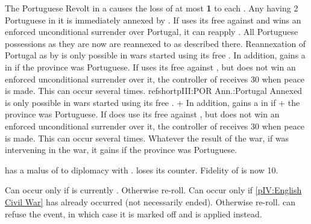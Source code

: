 \phpaix
\aparag The Portuguese Revolt in a \COL causes the loss of at most {\bf 1}
\STAB to each \MAJ.
\aparag Any \COL having 2 Portuguese \REVOLT \faceplus in it is immediately
annexed by \paysPortugal.
\aparag If \SPA uses its free \CB against \paysPortugal and wins an enforced
unconditional surrender over Portugal, it can reapply . All Portuguese possessions as they are now are
reannexed to \SPA as described there. Reannexation of Portugal as by
 is only possible in wars \SPA
started using its free \CB. In addition, \SPA gains a \Presidio in
\provinceTanger if the province was Portuguese.
\aparag If \SPA uses its free \CB against \paysPortugal, but does not win an
enforced unconditional surrender over it, the controller of \paysPortugal
receives 30 \VP when peace is made. This can occur several times.
refshort{pIII:POR Ann.:Portugal Annexed} is only possible in wars \SPA started
using its free \CB.  + \fphase In addition, \SPA gains a \Presidio in
 if + the province was Portuguese.  \ephase If \SPA does use
its free \CB against , but does not win an enforced
unconditional surrender over it, the controller of  receives 30
\VP when peace is made. This can occur several times.
\aparag Whatever the result of the war, if \ENG was intervening in the war, it
gains \provinceTanger if the province was Portuguese.





\effetlong
\aparag \TUR has a malus of  to diplomacy with \paysmaroc.
\aparag \paysmaroc loses its \corsaire counter.
\aparag Fidelity of \paysmaroc is now 10.





\condition{}
\aparag Can occur only if \ENG is currently \PROTANG. Otherwise re-roll.
\aparag Can occur only if \ref{pIV:English Civil War} has already occurred
(not necessarily ended). Otherwise re-roll.
\aparag \ENG can refuse the event, in which case it is marked off and \RD is
applied instead.

